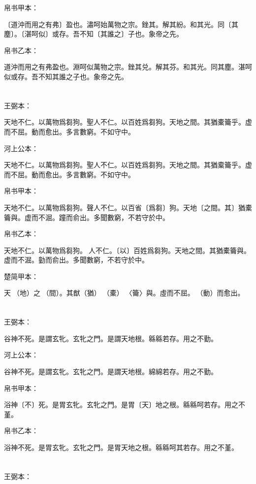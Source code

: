 \documentclass[a5paper]{ctexbook}
\begin{document}
    帛书甲本：

    〔道沖而用之有弗〕盈也。潚呵始萬物之宗。銼其。解其紛。和其光。同〔其塵〕。〔湛呵似〕或存。吾不知〔其誰之〕子也。象帝之先。

    帛书乙本：

    道沖而用之有弗盈也。淵呵似萬物之宗。銼其兑。解其芬。和其光。同其塵。湛呵似或存。吾不知其誰之子也。象帝之先。

    \chapter{}
    王弼本：

    天地不仁。以萬物爲芻狗。聖人不仁。以百姓爲芻狗。天地之間。其猶橐籥乎。虚而不屈。動而愈出。多言數窮。不如守中。

    河上公本：

    天地不仁。以萬物爲芻狗。聖人不仁。以百姓爲芻狗。天地之間。其猶槖籥乎。虚而不屈。動而愈出。多言數窮。不如守中。

    帛书甲本：

    天地不仁。以萬物爲芻狗。聲人不仁。以百省〔爲芻〕狗。天地〔之間。其〕猶橐籥與。虚而不淈。蹱而俞出。多聞數窮，不若守於中。

    帛书乙本：

    天地不仁。以萬物爲芻狗。𦔻人不仁。〔以〕百姓爲芻狗。天地之間。其猶橐籥與。虚而不淈。勭而俞出。多聞數窮，不若守於中。

    楚简甲本：

    天󶴵（地）之󶵁（間）。其猷（猶）󶵂（橐）󶵃〈籥〉與。虛而不屈。󶴠（動）而愈出。

    \chapter{}
    王弼本：

    谷神不死。是謂玄牝。玄牝之門。是謂天地根。緜緜若存。用之不勤。

    河上公本：

    谷神不死。是謂玄牝。玄牝之門。是謂天地根。綿綿若存。用之不勤。

    帛书甲本：

    浴神〔不〕死。是胃玄牝。玄牝之門。是胃〔天〕地之根。緜緜呵若存。用之不堇。

    帛书乙本：

    浴神不死。是胃玄牝。玄牝之門。是胃天地之根。緜緜呵其若存。用之不堇。

    \chapter{}
    王弼本：
\end{document}
